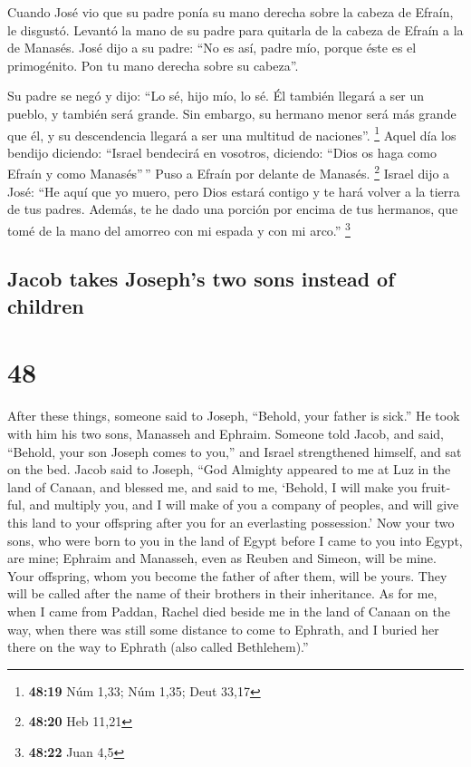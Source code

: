 \begin{paracol}{2}
 Cuando José vio que su padre ponía su mano derecha sobre
la cabeza de Efraín, le disgustó. Levantó la mano de su padre para
quitarla de la cabeza de Efraín a la de Manasés.  José
dijo a su padre: ``No es así, padre mío, porque éste es el primogénito.
Pon tu mano derecha sobre su cabeza''.

 Su padre se negó y dijo: ``Lo sé, hijo mío, lo sé. Él
también llegará a ser un pueblo, y también será grande. Sin embargo, su
hermano menor será más grande que él, y su descendencia llegará a ser
una multitud de naciones''. \footnote{\textbf{48:19} Núm 1,33; Núm 1,35;
  Deut 33,17}  Aquel día los bendijo diciendo: ``Israel
bendecirá en vosotros, diciendo: ``Dios os haga como Efraín y como
Manasés''\,'' Puso a Efraín por delante de Manasés. \footnote{\textbf{48:20}
  Heb 11,21}  Israel dijo a José: ``He aquí que yo muero,
pero Dios estará contigo y te hará volver a la tierra de tus padres.
 Además, te he dado una porción por encima de tus
hermanos, que tomé de la mano del amorreo con mi espada y con mi arco.''
\footnote{\textbf{48:22} Juan 4,5}

\switchcolumn
\begin{otherlanguage}{english}

\hypertarget{jacob-takes-josephs-two-sons-instead-of-children}{%
\subsection{Jacob takes Joseph's two sons instead of
children}\label{jacob-takes-josephs-two-sons-instead-of-children}}

\hypertarget{section-95}{%
\section{48}\label{section-95}}

 After these things, someone said to Joseph, ``Behold,
your father is sick.'' He took with him his two sons, Manasseh and
Ephraim.  Someone told Jacob, and said, ``Behold, your son
Joseph comes to you,'' and Israel strengthened himself, and sat on the
bed.  Jacob said to Joseph, ``God Almighty appeared to me
at Luz in the land of Canaan, and blessed me,  and said to
me, `Behold, I will make you fruitful, and multiply you, and I will make
of you a company of peoples, and will give this land to your offspring
after you for an everlasting possession.'  Now your two
sons, who were born to you in the land of Egypt before I came to you
into Egypt, are mine; Ephraim and Manasseh, even as Reuben and Simeon,
will be mine.  Your offspring, whom you become the father
of after them, will be yours. They will be called after the name of
their brothers in their inheritance.  As for me, when I
came from Paddan, Rachel died beside me in the land of Canaan on the
way, when there was still some distance to come to Ephrath, and I buried
her there on the way to Ephrath (also called Bethlehem).''


\end{otherlanguage}
\end{paracol}
